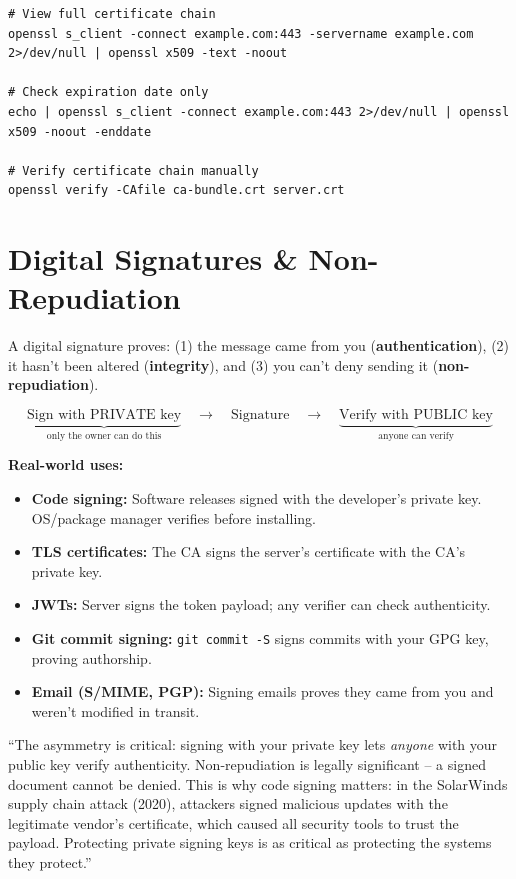 \documentclass[11pt, letterpaper]{article}
\newcommand{\talkingpoint}[1]{%
  \begin{tcolorbox}[colback=talkbg, colframe=talkborder,
    title={\bfseries Interview Talking Point}, arc=3pt, boxrule=1pt]
  #1
  \end{tcolorbox}%
}
\begin{document}
\begin{lstlisting}[style=shell, caption={Inspect a certificate from the command line}]
# View full certificate chain
openssl s_client -connect example.com:443 -servername example.com 2>/dev/null | openssl x509 -text -noout

# Check expiration date only
echo | openssl s_client -connect example.com:443 2>/dev/null | openssl x509 -noout -enddate

# Verify certificate chain manually
openssl verify -CAfile ca-bundle.crt server.crt
\end{lstlisting}

\section*{Digital Signatures \& Non-Repudiation}

A digital signature proves: (1) the message came from you (\textbf{authentication}), (2) it hasn't been altered (\textbf{integrity}), and (3) you can't deny sending it (\textbf{non-repudiation}).

\[
  \underbrace{\text{Sign with PRIVATE key}}_{\text{only the owner can do this}}
  \quad\longrightarrow\quad \text{Signature}
  \quad\longrightarrow\quad
  \underbrace{\text{Verify with PUBLIC key}}_{\text{anyone can verify}}
\]

\textbf{Real-world uses:}
\begin{itemize}[noitemsep]
  \item \textbf{Code signing:} Software releases signed with the developer's private key. OS/package manager verifies before installing.
  \item \textbf{TLS certificates:} The CA signs the server's certificate with the CA's private key.
  \item \textbf{JWTs:} Server signs the token payload; any verifier can check authenticity.
  \item \textbf{Git commit signing:} \texttt{git commit -S} signs commits with your GPG key, proving authorship.
  \item \textbf{Email (S/MIME, PGP):} Signing emails proves they came from you and weren't modified in transit.
\end{itemize}

\talkingpoint{``The asymmetry is critical: signing with your private key lets \emph{anyone} with your public key verify authenticity. Non-repudiation is legally significant -- a signed document cannot be denied. This is why code signing matters: in the SolarWinds supply chain attack (2020), attackers signed malicious updates with the legitimate vendor's certificate, which caused all security tools to trust the payload. Protecting private signing keys is as critical as protecting the systems they protect.''}
\end{document}
